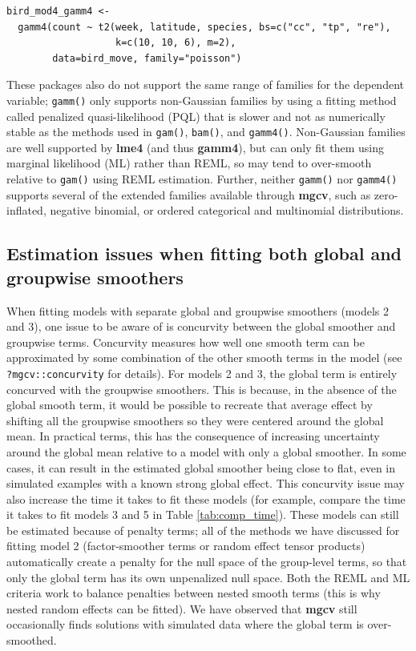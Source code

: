 \documentclass[12pt]{article}
\begin{document}
\begin{verbatim}
bird_mod4_gamm4 <-
  gamm4(count ~ t2(week, latitude, species, bs=c("cc", "tp", "re"),
                   k=c(10, 10, 6), m=2),
        data=bird_move, family="poisson")
\end{verbatim}

These packages also do not support the same range of families for the
dependent variable; \texttt{gamm()} only supports non-Gaussian families
by using a fitting method called penalized quasi-likelihood (PQL) that
is slower and not as numerically stable as the methods used in
\texttt{gam()}, \texttt{bam()}, and \texttt{gamm4()}. Non-Gaussian
families are well supported by \textbf{lme4} (and thus \textbf{gamm4}),
but can only fit them using marginal likelihood (ML) rather than REML,
so may tend to over-smooth relative to \texttt{gam()} using REML
estimation. Further, neither \texttt{gamm()} nor \texttt{gamm4()}
supports several of the extended families available through
\textbf{mgcv}, such as zero-inflated, negative binomial, or ordered
categorical and multinomial distributions.

\subsection{Estimation issues when fitting both global and groupwise
smoothers}\label{estimation-issues-when-fitting-both-global-and-groupwise-smoothers}

When fitting models with separate global and groupwise smoothers (models
2 and 3), one issue to be aware of is concurvity between the global
smoother and groupwise terms. Concurvity measures how well one smooth
term can be approximated by some combination of the other smooth terms
in the model (see \texttt{?mgcv::concurvity} for details). For models 2
and 3, the global term is entirely concurved with the groupwise
smoothers. This is because, in the absence of the global smooth term, it
would be possible to recreate that average effect by shifting all the
groupwise smoothers so they were centered around the global mean. In
practical terms, this has the consequence of increasing uncertainty
around the global mean relative to a model with only a global smoother.
In some cases, it can result in the estimated global smoother being
close to flat, even in simulated examples with a known strong global
effect. This concurvity issue may also increase the time it takes to fit
these models (for example, compare the time it takes to fit models 3 and
5 in Table \ref{tab:comp_time}). These models can still be estimated
because of penalty terms; all of the methods we have discussed for
fitting model 2 (factor-smoother terms or random effect tensor products)
automatically create a penalty for the null space of the group-level
terms, so that only the global term has its own unpenalized null space.
Both the REML and ML criteria work to balance penalties between nested
smooth terms (this is why nested random effects can be fitted). We have
observed that \textbf{mgcv} still occasionally finds solutions with
simulated data where the global term is over-smoothed.
\end{document}
